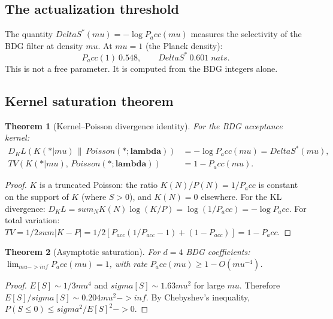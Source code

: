 \documentclass[11pt]{article}
\def\Delta{Delta}%
\def\sigma{sigma}%
\def\mu{mu}%
\def\lambda{lambda}%
\def\mathrm#1{#1}%
\def\mathbf#1{#1}%
\def\mathbb#1{#1}%
\def\frac#1#2{#1/#2}%
\def\cdot{*}%
\def\approx{~}%
\def\to{->}%
\def\infty{inf}%
\def\sum{sum}%
\def\Pacc{P_acc}%
\def\Dkl{D_KL}%
\def\TV{TV}%
\newtheorem{theorem}{Theorem}
\newcommand{\Pacc}{\ensuremath{P_{\mathrm{acc}}}}
\newcommand{\Dkl}{\ensuremath{D_{\mathrm{KL}}}}
\newcommand{\TV}{\ensuremath{\mathrm{TV}}}
\begin{document}
\subsection{The actualization threshold}

The quantity $\Delta S^*(\mu)=-\log\Pacc(\mu)$ measures the selectivity of the BDG filter at density $\mu$. At $\mu=1$ (the Planck density):
\begin{equation}
\Pacc(1)\approx 0.548, \qquad \Delta S^* \approx 0.601 \;\mathrm{nats}.
\end{equation}
This is not a free parameter. It is computed from the BDG integers alone.

\subsection{Kernel saturation theorem}

\begin{theorem}[Kernel--Poisson divergence identity]
\label{thm:kl}
For the BDG acceptance kernel:
\begin{align}
\Dkl(K(\cdot|\mu)\,\|\,\mathrm{Poisson}(\cdot;\boldsymbol{\lambda})) &= -\log\Pacc(\mu) = \Delta S^*(\mu), \label{eq:kl}\\
\TV(K(\cdot|\mu),\,\mathrm{Poisson}(\cdot;\boldsymbol{\lambda})) &= 1-\Pacc(\mu). \label{eq:tv}
\end{align}
\end{theorem}
\begin{proof}
$K$ is a truncated Poisson: the ratio $K(\mathbf{N})/P(\mathbf{N})=1/\Pacc$ is constant on the support of $K$ (where $S>0$), and $K(\mathbf{N})=0$ elsewhere. For the KL divergence: $\Dkl=\sum_{\mathbf{N}} K(\mathbf{N})\log(K/P)=\log(1/\Pacc)=-\log\Pacc$. For total variation: $\TV=\frac{1}{2}\sum|K-P|=\frac{1}{2}[P_{\mathrm{acc}}(1/P_{\mathrm{acc}}-1)+(1-P_{\mathrm{acc}})]=1-\Pacc$.
\end{proof}

\begin{theorem}[Asymptotic saturation]
\label{thm:saturation}
For $d=4$ BDG coefficients: $\lim_{\mu\to\infty}\Pacc(\mu)=1$, with rate $\Pacc(\mu)\ge 1-O(\mu^{-4})$.
\end{theorem}
\begin{proof}
$\mathbb{E}[S]\sim\frac{1}{3}\mu^4$ and $\sigma[S]\sim 1.63\mu^2$ for large $\mu$. Therefore $\mathbb{E}[S]/\sigma[S]\sim 0.204\mu^2\to\infty$. By Chebyshev's inequality, $\mathbb{P}(S\le 0)\le\sigma^2/\mathbb{E}[S]^2\to 0$.
\end{proof}
\end{document}
